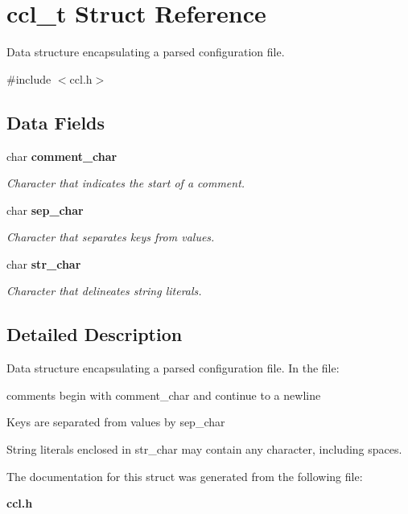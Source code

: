 \section{ccl\_\-t Struct Reference}
\label{structccl__t}


Data structure encapsulating a parsed configuration file.  


{\ttfamily \#include $<$ccl.h$>$}\subsection*{Data Fields}
\begin{DoxyCompactItemize}
\item 
char {\bf comment\_\-char}\label{structccl__t_ab3b455aca4b664fcda172b6c1606e0c8}

\begin{DoxyCompactList}\small\item\em Character that indicates the start of a comment. \item\end{DoxyCompactList}\item 
char {\bf sep\_\-char}\label{structccl__t_afd2461642040cb4d35b36908c1a017c0}

\begin{DoxyCompactList}\small\item\em Character that separates keys from values. \item\end{DoxyCompactList}\item 
char {\bf str\_\-char}\label{structccl__t_a721f055750dd40e32f768349c4335655}

\begin{DoxyCompactList}\small\item\em Character that delineates string literals. \item\end{DoxyCompactList}\end{DoxyCompactItemize}


\subsection{Detailed Description}
Data structure encapsulating a parsed configuration file. In the file:
\begin{DoxyItemize}
\item comments begin with {\ttfamily comment\_\-char} and continue to a newline
\item Keys are separated from values by {\ttfamily sep\_\-char} 
\item String literals enclosed in {\ttfamily str\_\-char} may contain any character, including spaces. 
\end{DoxyItemize}

The documentation for this struct was generated from the following file:\begin{DoxyCompactItemize}
\item 
{\bf ccl.h}\end{DoxyCompactItemize}
